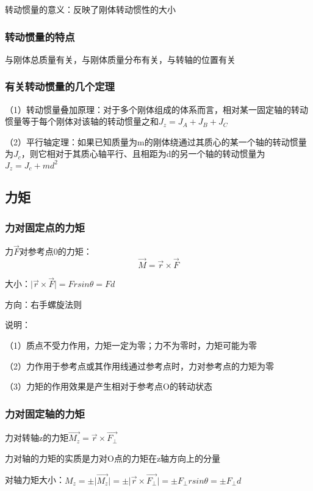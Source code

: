 \documentclass[UTF8]{article}
\begin{document}
    转动惯量的意义：反映了刚体转动惯性的大小

\subsubsection{转动惯量的特点}

    与刚体总质量有关，与刚体质量分布有关，与转轴的位置有关

\subsubsection{有关转动惯量的几个定理}

    （1）转动惯量叠加原理：对于多个刚体组成的体系而言，相对某一固定轴的转动惯量等于每个刚体对该轴的转动惯量之和$J_z = J_A + J_B + J_C$

    （2）平行轴定理：如果已知质量为m的刚体绕通过其质心的某一个轴的转动惯量为$J_c$，则它相对于其质心轴平行、且相距为d的另一个轴的转动惯量为$J_z = J_c + md^2$

\subsection{力矩}
\subsubsection{力对固定点的力矩}

    力$\vec{F}$对参考点0的力矩：\[\vec{M} = \vec{r}\times\vec{F}\]

    大小：$\lvert \vec{r}\times\vec{F}\rvert = Frsin\theta = Fd$

    方向：右手螺旋法则

    说明：

    \;\;\;（1）质点不受力作用，力矩一定为零；力不为零时，力矩可能为零

    \;\;（2）力作用于参考点或其作用线通过参考点时，力对参考点的力矩为零

    \;\;（3）力矩的作用效果是产生相对于参考点O的转动状态

\subsubsection{力对固定轴的力矩}

    力对转轴z的力矩$\vec{M_z} = \vec{r}\times\vec{F_{\bot}}$

    力对轴的力矩的实质是力对O点的力矩在z轴方向上的分量

    对轴力矩大小：$M_z = \pm\lvert\vec{M_z}\rvert = \pm\lvert\vec{r}\times\vec{F_{\bot}}\rvert = \pm F_{\bot}rsin\theta = \pm F_{\bot}d$
\end{document}
